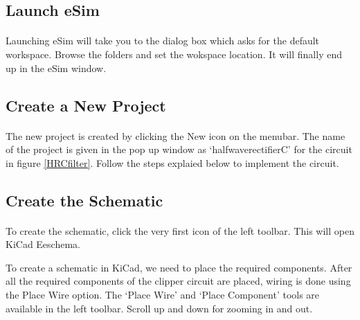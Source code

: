 \subsection*{Launch eSim}

\paragraph{}
 Launching eSim will take you to the dialog box which asks for the default workspace. Browse the folders and set the wokspace location. It will finally end up in the eSim window.%

\subsection*{Create a New Project}

\paragraph{ } The new project is created by clicking the New icon on the
menubar. The name of the project is given in the pop up window as `halfwaverectifierC' for the circuit in figure \ref{HRCfilter}. Follow the steps explaied below to implement the circuit.
\subsection*{Create the Schematic}

\paragraph{}  To create the schematic, click the very first icon of the
left toolbar. This will open KiCad Eeschema.


To create a schematic in KiCad, we need to place the required components. After all the required components of the clipper circuit are placed, wiring is
done using the Place Wire option. The `Place Wire' and `Place Component' tools are available in the left toolbar. Scroll up and down for zooming in and out.




